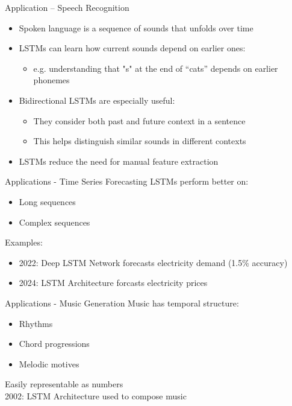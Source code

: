 \documentclass[10pt, aspectratio=169]{beamer}
\begin{document}
\begin{frame}[t]{Application – Speech Recognition}
\begin{itemize}
  \item Spoken language is a sequence of sounds that unfolds over time
  \pause
  \item LSTMs can learn how current sounds depend on earlier ones:
    \begin{itemize}
      \item e.g. understanding that "s" at the end of “cats” depends on earlier phonemes
    \end{itemize}
  \pause
  \item Bidirectional LSTMs are especially useful:
    \begin{itemize}
      \item They consider both past and future context in a sentence
      \item This helps distinguish similar sounds in different contexts
    \end{itemize}
  \pause
  \item LSTMs reduce the need for manual feature extraction
\end{itemize}
\end{frame}

\begin{frame}[t]{Applications - Time Series Forecasting}
LSTMs perform better on: \pause
\begin{itemize}
    \item Long sequences \pause
    \item Complex sequences \pause
\end{itemize}
Examples: \pause
\begin{itemize}
    \item 2022: Deep LSTM Network forecasts electricity demand (1.5\% accuracy) \pause
    \item 2024: LSTM Architecture forcasts electricity prices
\end{itemize}
\end{frame}


\begin{frame}[t]{Applications - Music Generation}
Music has temporal structure: \pause
\begin{itemize}
    \item Rhythms \pause
    \item Chord progressions \pause
    \item Melodic motives \pause
\end{itemize}
Easily representable as numbers\pause \\
\vspace{1em}
2002: LSTM Architecture used to compose music
\end{frame}
\end{document}
